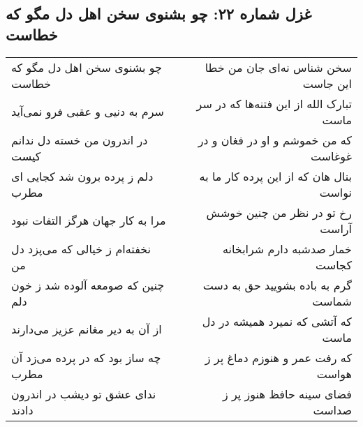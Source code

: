 \begin{center}
\section*{غزل شماره ۲۲: چو بشنوی سخن اهل دل مگو که خطاست}
\label{sec:sh022}
\begin{longtable}{l p{0.5cm} r}
چو بشنوی سخن اهل دل مگو که خطاست
&&
سخن شناس نه‌ای جان من خطا این جاست
\\
سرم به دنیی و عقبی فرو نمی‌آید
&&
تبارک الله از این فتنه‌ها که در سر ماست
\\
در اندرون من خسته دل ندانم کیست
&&
که من خموشم و او در فغان و در غوغاست
\\
دلم ز پرده برون شد کجایی ای مطرب
&&
بنال هان که از این پرده کار ما به نواست
\\
مرا به کار جهان هرگز التفات نبود
&&
رخ تو در نظر من چنین خوشش آراست
\\
نخفته‌ام ز خیالی که می‌پزد دل من
&&
خمار صدشبه دارم شرابخانه کجاست
\\
چنین که صومعه آلوده شد ز خون دلم
&&
گرم به باده بشویید حق به دست شماست
\\
از آن به دیر مغانم عزیز می‌دارند
&&
که آتشی که نمیرد همیشه در دل ماست
\\
چه ساز بود که در پرده می‌زد آن مطرب
&&
که رفت عمر و هنوزم دماغ پر ز هواست
\\
ندای عشق تو دیشب در اندرون دادند
&&
فضای سینه حافظ هنوز پر ز صداست
\\
\end{longtable}
\end{center}
